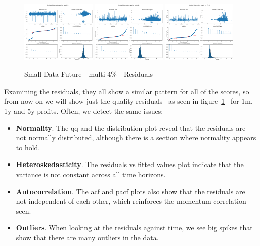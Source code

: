 \documentclass[11pt,english,a4paper,hidelinks]{book}
\begin{document}
\begin{figure}[H]
    \centering
    \includegraphics[width=0.32\textwidth]{images/code/models/linear_regression/first_model/Multi/quality_profit_1m_residuals.png}
    \includegraphics[width=0.32\textwidth]{images/code/models/linear_regression/first_model/Multi/quality_profit_1y_residuals.png}
    \includegraphics[width=0.32\textwidth]{images/code/models/linear_regression/first_model/Multi/quality_profit_5y_residuals.png}
    \caption{Small Data Future - \acrshort{multi} 4\% - Residuals}
    \label{fig:first_linear_regression_residuals}
\end{figure}

\noindent Examining the residuals, they all show a similar pattern for all of the scores, so from now on we will show just the quality residuals --as seen in figure~\ref{fig:first_linear_regression_residuals}-- for 1m, 1y and 5y profits. Often, we detect the same issues:
\begin{itemize}
    \item \textbf{Normality}. The \acrshort{qq} and the distribution plot reveal that the residuals are not normally distributed, although there is a section where normality appears to hold.
    \item \textbf{Heteroskedasticity}. The residuals vs fitted values plot indicate that the variance is not constant across all time horizons.
    \item \textbf{Autocorrelation}. The \acrshort{acf} and \acrshort{pacf} plots also show that the residuals are not independent of each other, which reinforces the momentum correlation seen.
    \item \textbf{Outliers}. When looking at the residuals against time, we see big spikes that show that there are many outliers in the data.
\end{itemize}
\end{document}
